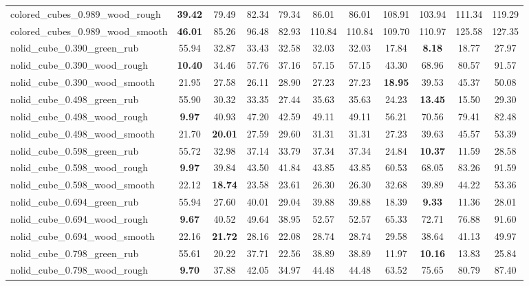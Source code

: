 \begin{table}[H]
{\begin{tabular}{l cccccccccc}
        colored\_cubes\_0.989\_wood\_rough & \textbf{39.42} & 79.49 & 82.34 & 79.34 & 86.01 & 86.01 & 108.91 & 103.94 & 111.34 & 119.29 \\
        colored\_cubes\_0.989\_wood\_smooth & \textbf{46.01} & 85.26 & 96.48 & 82.93 & 110.84 & 110.84 & 109.70 & 110.97 & 125.58 & 127.35 \\
        nolid\_cube\_0.390\_green\_rub & 55.94 & 32.87 & 33.43 & 32.58 & 32.03 & 32.03 & 17.84 & \textbf{8.18} & 18.77 & 27.97 \\
        nolid\_cube\_0.390\_wood\_rough & \textbf{10.40} & 34.46 & 57.76 & 37.16 & 57.15 & 57.15 & 43.30 & 68.96 & 80.57 & 91.57 \\
        nolid\_cube\_0.390\_wood\_smooth & 21.95 & 27.58 & 26.11 & 28.90 & 27.23 & 27.23 & \textbf{18.95} & 39.53 & 45.37 & 50.08 \\
        nolid\_cube\_0.498\_green\_rub & 55.90 & 30.32 & 33.35 & 27.44 & 35.63 & 35.63 & 24.23 & \textbf{13.45} & 15.50 & 29.30 \\
        nolid\_cube\_0.498\_wood\_rough & \textbf{9.97} & 40.93 & 47.20 & 42.59 & 49.11 & 49.11 & 56.21 & 70.56 & 79.41 & 82.48 \\
        nolid\_cube\_0.498\_wood\_smooth & 21.70 & \textbf{20.01} & 27.59 & 29.60 & 31.31 & 31.31 & 27.23 & 39.63 & 45.57 & 53.39 \\
        nolid\_cube\_0.598\_green\_rub & 55.72 & 32.98 & 37.14 & 33.79 & 37.34 & 37.34 & 24.84 & \textbf{10.37} & 11.59 & 28.58 \\
        nolid\_cube\_0.598\_wood\_rough & \textbf{9.97} & 39.84 & 43.50 & 41.84 & 43.85 & 43.85 & 60.53 & 68.05 & 83.26 & 91.59 \\
        nolid\_cube\_0.598\_wood\_smooth & 22.12 & \textbf{18.74} & 23.58 & 23.61 & 26.30 & 26.30 & 32.68 & 39.89 & 44.22 & 53.36 \\
        nolid\_cube\_0.694\_green\_rub & 55.94 & 27.60 & 40.01 & 29.04 & 39.88 & 39.88 & 18.39 & \textbf{9.33} & 11.36 & 28.01 \\
        nolid\_cube\_0.694\_wood\_rough & \textbf{9.67} & 40.52 & 49.64 & 38.95 & 52.57 & 52.57 & 65.33 & 72.71 & 76.88 & 91.60 \\
        nolid\_cube\_0.694\_wood\_smooth & 22.16 & \textbf{21.72} & 28.16 & 22.08 & 28.74 & 28.74 & 29.58 & 38.64 & 41.13 & 49.97 \\
        nolid\_cube\_0.798\_green\_rub & 55.61 & 20.22 & 37.71 & 22.56 & 38.89 & 38.89 & 11.97 & \textbf{10.16} & 13.83 & 25.84 \\
        nolid\_cube\_0.798\_wood\_rough & \textbf{9.70} & 37.88 & 42.05 & 34.97 & 44.48 & 44.48 & 63.52 & 75.65 & 80.79 & 87.40 \\

\end{tabular}}
\end{table}
